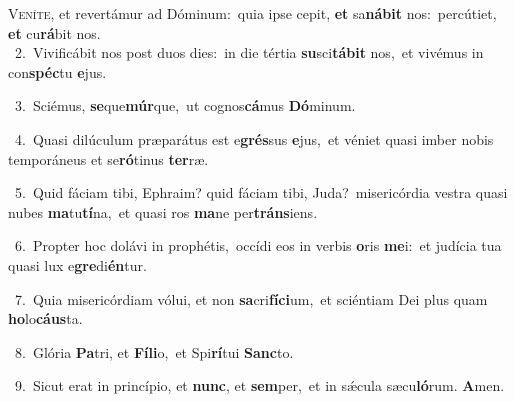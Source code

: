 \lettrine{\initial\textcolor{\initialcolor}{V}}{eníte,} et revertámur ad Dóminum:~\dagger quia ipse cepit, \textbf{et} sa\-\textbf{ná}\-\textbf{bit} nos:~\star percútiet, \textbf{et} cu\-\textbf{rá}\-bit nos.\\
{\numbfont\textcolor{\numbcolor}{~2.}}~Vivificábit nos post duos dies:~\dagger in die tértia \textbf{su}\-sci\-\textbf{tá}\-\textbf{bit} nos,~\star et vivémus in con\-\textbf{spéc}\-tu \textbf{e}\-jus.\par
{\numbfont\textcolor{\numbcolor}{~3.}}~Sciémus, \textbf{se}\-que\-\textbf{múr}\-que,~\star ut cognos\-\textbf{cá}\-mus \textbf{Dó}\-minum.\par
{\numbfont\textcolor{\numbcolor}{~4.}}~Quasi dilúculum præparátus est e\-\textbf{grés}\-sus \textbf{e}\-jus,~\star et véniet quasi imber nobis temporáneus et se\-\textbf{ró}\-tinus \textbf{ter}\-ræ.\par
{\numbfont\textcolor{\numbcolor}{~5.}}~Quid fáciam tibi, Ephraim? quid fáciam tibi, Juda?~\dagger misericórdia vestra quasi nubes \textbf{ma}\-tu\-\textbf{tí}\-na,~\star et quasi ros \textbf{ma}\-ne per\-\textbf{tráns}\-iens.\par
{\numbfont\textcolor{\numbcolor}{~6.}}~Propter hoc dolávi in prophétis,~\dagger occídi eos in verbis \textbf{o}\-ris \textbf{me}\-i:~\star et judícia tua quasi lux e\-\textbf{gre}\-di\-\textbf{én}\-tur.\par
{\numbfont\textcolor{\numbcolor}{~7.}}~Quia misericórdiam vólui, et non \textbf{sa}\-cri\-\textbf{fí}\-\textbf{ci}um,~\star et sciéntiam Dei plus quam \textbf{ho}\-lo\-\textbf{cáus}\-ta.\par
{\numbfont\textcolor{\numbcolor}{~8.}}~Glória \textbf{Pa}\-tri, et \textbf{Fí}\-\textbf{li}o,~\star et Spi\-\textbf{rí}\-tui \textbf{Sanc}\-to.\par
{\numbfont\textcolor{\numbcolor}{~9.}}~Sicut erat in princípio, et \textbf{nunc}\-, et \textbf{sem}\-per,~\star et in sǽcula sæcu\-\textbf{ló}\-rum. \textbf{A}\-men.\par
